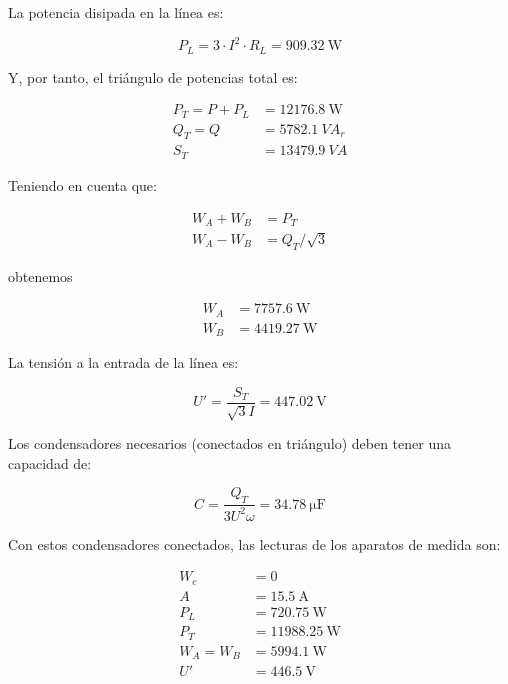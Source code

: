 La potencia disipada en la línea es:

\begin{equation*}
  P_L = 3 \cdot I^2 \cdot R_L = \SI{909.32}{\watt}
\end{equation*}

Y, por tanto, el triángulo de potencias total es:

\begin{align*}
  P_T = P + P_L &= \SI{12176.8}{\watt}\\
  Q_T = Q &= \SI{5782.1}{VA}_r\\
  S_T &= \SI{13479.9}{VA}
\end{align*}

Teniendo en cuenta que:

\begin{align*}
  W_A + W_B &= P_T\\
  W_A - W_B &= Q_T / \sqrt{3}
\end{align*}

obtenemos

\begin{align*}
  W_A &= \SI{7757.6}{\watt}\\
  W_B &= \SI{4419.27}{\watt}
\end{align*}

La tensión a la entrada de la línea es:

\begin{equation*}
  U' = \frac{S_T}{\sqrt{3} I} = \SI{447.02}{\volt}
\end{equation*}

Los condensadores necesarios (conectados en triángulo) deben tener una
capacidad de:

\begin{equation*}
  C = \frac{Q_T}{3U^2\omega} = \SI{34.78}{\micro\farad}
\end{equation*}

Con estos condensadores conectados, las lecturas de los aparatos de
medida son:

\begin{align*}
  W_c &= 0\\
  A &= \SI{15.5}{\ampere}\\
  P_L &= \SI{720.75}{\watt}\\
  P_T &= \SI{11988.25}{\watt}\\
  W_A = W_B &= \SI{5994.1}{\watt}\\
  U' &= \SI{446.5}{\volt}\\  
\end{align*}



